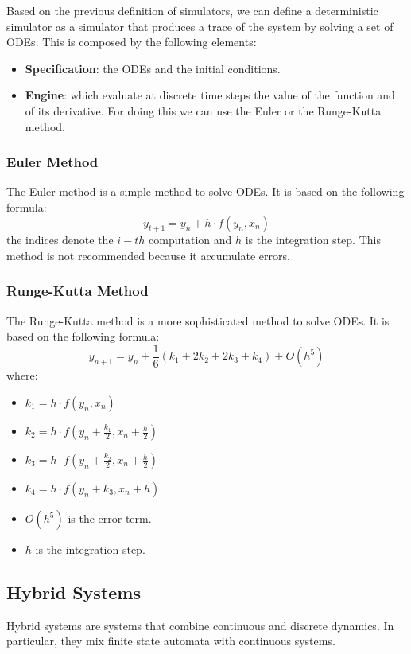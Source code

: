 Based on the previous definition of simulators, we can define a deterministic
simulator as a simulator that produces a trace of the system by solving a set of
ODEs. This is composed by the following elements:
\begin{itemize}
    \item \textbf{Specification}: the ODEs and the initial conditions.
    \item \textbf{Engine}: which evaluate at discrete time steps the value of
          the function and of its derivative. For doing this we can use the Euler
          or the Runge-Kutta method.
\end{itemize}
\subsubsection{Euler Method}
The Euler method is a simple method to solve ODEs. It is based on the following
formula:
\begin{equation}
    y_{t + 1} = y_n + h \cdot f(y_n, x_n)
\end{equation}
the indices denote the $i-th$ computation and $h$ is the integration step. This
method is not recommended because it accumulate errors.
\subsubsection{Runge-Kutta Method}
The Runge-Kutta method is a more sophisticated method to solve ODEs. It is based
on the following formula:
\begin{equation}
    y_{n + 1} = y_n + \frac{1}{6} \left( k_1 + 2k_2 + 2k_3 + k_4 \right) + O(h^5)
\end{equation}
where:
\begin{itemize}
    \item $k_1 = h \cdot f(y_n, x_n)$
    \item $k_2 = h \cdot f(y_n + \frac{k_1}{2}, x_n + \frac{h}{2})$
    \item $k_3 = h \cdot f(y_n + \frac{k_2}{2}, x_n + \frac{h}{2})$
    \item $k_4 = h \cdot f(y_n + k_3, x_n + h)$
    \item $O(h^5)$ is the error term.
    \item $h$ is the integration step.
\end{itemize}
\subsection{Hybrid Systems}
Hybrid systems are systems that combine continuous and discrete dynamics. In
particular, they mix finite state automata with continuous systems.

